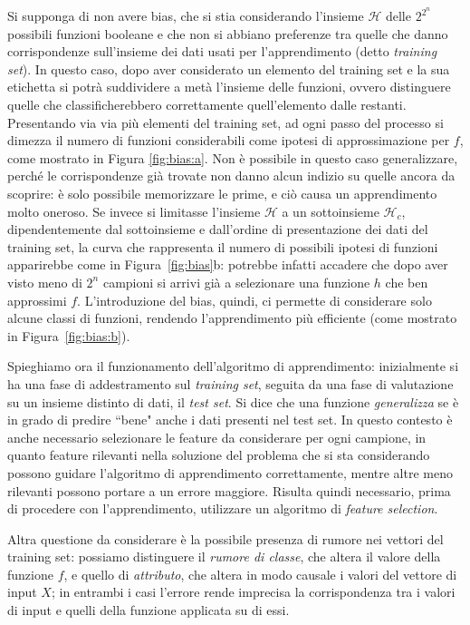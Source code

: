 \documentclass[oneside, openany]{book}
\begin{document}
		Si supponga di non avere bias, che si stia considerando l'insieme $\mathcal{H}$ delle $2^{2^n}$ possibili funzioni booleane e che non si abbiano preferenze tra quelle che danno corrispondenze sull'insieme dei dati usati per l'apprendimento (detto \textit{training set}). In questo caso, dopo aver considerato un elemento del training set e la sua etichetta si potrà suddividere a metà l'insieme delle funzioni, ovvero distinguere quelle che classificherebbero correttamente quell'elemento dalle restanti. Presentando via via più elementi del training set, ad ogni passo del processo si dimezza il numero di funzioni considerabili come ipotesi di approssimazione per $f$, come mostrato in Figura \ref{fig:bias:a}. Non è possibile in questo caso generalizzare, perché le corrispondenze già trovate non danno alcun indizio su quelle ancora da scoprire: è solo possibile memorizzare le prime, e ciò causa un apprendimento molto oneroso.\newline
		Se invece si limitasse l'insieme $\mathcal{H}$ a un sottoinsieme $\mathcal{H}_c$, dipendentemente dal sottoinsieme e dall'ordine di presentazione dei dati del training set, la curva che rappresenta il numero di possibili ipotesi di funzioni apparirebbe come in Figura~\ref{fig:bias}b: potrebbe infatti accadere che dopo aver visto meno di $2^n$ campioni si arrivi già a selezionare una funzione $h$ che ben approssimi $f$. L'introduzione del bias, quindi, ci permette di considerare solo alcune classi di funzioni, rendendo l'apprendimento più efficiente (come mostrato in Figura~\ref{fig:bias:b}).
		
		Spieghiamo ora il funzionamento dell'algoritmo di apprendimento: inizialmente si ha una fase di addestramento sul \textit{training set}, seguita da una fase di valutazione su un insieme distinto di dati, il \textit{test set}. Si dice che una funzione \textit{generalizza} se è in grado di predire ``bene" anche i dati presenti nel test set.\newline
		In questo contesto è anche necessario selezionare le feature da considerare per ogni campione, in quanto feature rilevanti nella soluzione del problema che si sta considerando possono guidare l'algoritmo di apprendimento correttamente, mentre altre meno rilevanti possono portare a un errore maggiore. Risulta quindi necessario, prima di procedere con l'apprendimento, utilizzare un algoritmo di \textit{feature selection}.
		
		Altra questione da considerare è la possibile presenza di rumore nei vettori del training set: possiamo distinguere il \textit{rumore di classe}, che altera il valore della funzione $f$, e quello di \textit{attributo}, che altera in modo causale i valori del vettore di input $X$; in entrambi i casi l'errore rende imprecisa la corrispondenza tra i valori di input e quelli della funzione applicata su di essi.\\
		
\end{document}
